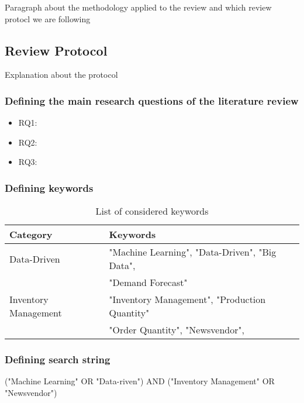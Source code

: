 Paragraph about the methodology applied to the review and which review protocl we are following

\subsection{Review Protocol}

Explanation about the protocol

\subsubsection{Defining the main research questions of the literature review}



\begin{itemize}
    \item RQ1: 
    \item RQ2: 
    \item RQ3: 
\end{itemize}

\subsubsection{Defining keywords}
\label{subsubsec: Defining keywords}



\begin{table}
	\caption{List of considered keywords}
	\centering
	\begin{tabular}{ll}
		\toprule
		Category & Keywords \\
		\midrule
		Data-Driven & "Machine Learning", "Data-Driven", "Big Data", \\
		& "Demand Forecast" \\
		Inventory Management & "Inventory Management", "Production Quantity" \\
		& "Order Quantity", "Newsvendor",  \\
		\bottomrule 
	\end{tabular}
	\label{tab: keywords}
\end{table}

\subsubsection{Defining search string}
\label{subsubsec: Defining search string}



\noindent ("Machine Learning" OR "Data-riven") AND ("Inventory Management" OR "Newsvendor")


